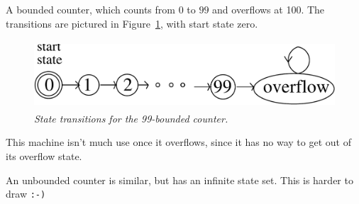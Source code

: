 \begin{example}
A bounded counter, which counts from $0$ to $99$ and overflows at 100.
The transitions are pictured in Figure~\ref{fig:counter}, with start state
zero.

\begin{figure}[htbp]
\centering \includegraphics[height=1in]{figures/counter}
\caption{\em State transitions for the 99-bounded counter.}
\label{fig:counter}
\end{figure}

This machine isn't much use once it overflows, since it has no way to get
out of its overflow state.

\end{example}

\begin{example}
An unbounded counter is similar, but has an infinite state set.  This is
harder to draw \texttt{:-)}
\end{example}

